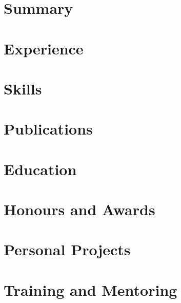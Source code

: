 \documentclass[english,a4paper,10pt]{extarticle}
\begin{document}
\pagestyle{normal_page}
\thispagestyle{first_page}

\section{Summary}


\section{Experience}


\section{Skills}


\section{Publications}


\section{Education}


\section{Honours and Awards}


\section{Personal Projects}



\section{Training and Mentoring}


\thispagestyle{last_page}

\end{document}
